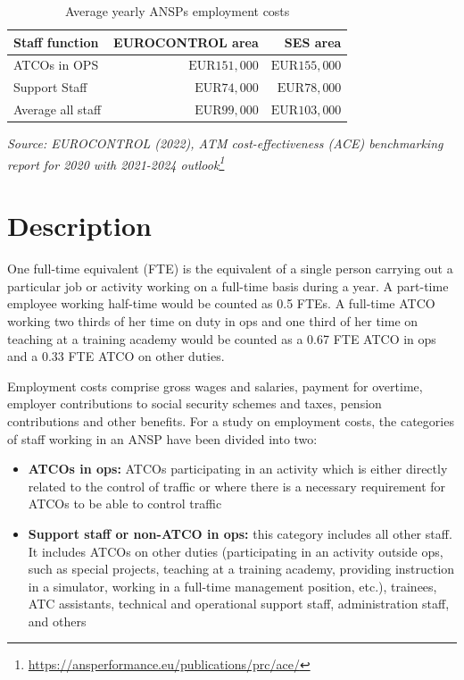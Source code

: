 \documentclass[
  11pt,
  a4paper,
]{book}
\DeclareRobustCommand{\href}[2]{#2\footnote{\url{#1}}}
\begin{document}
\hypertarget{tbl-ansp-employment-cost-general}{}
\setlength{\LTpost}{0mm}
\begin{longtable}{lrr}
\caption{\label{tbl-ansp-employment-cost-general}Average yearly ANSPs employment costs }\tabularnewline

\toprule
Staff function & EUROCONTROL area & SES area \\ 
\midrule
ATCOs in OPS & $\text{EUR}151,000$ & $\text{EUR}155,000$ \\ 
Support Staff & $\text{EUR}74,000$ & $\text{EUR}78,000$ \\ 
Average all staff & $\text{EUR}99,000$ & $\text{EUR}103,000$ \\ 
\bottomrule
\end{longtable}
\begin{minipage}{\linewidth}
\emph{Source: \href{https://ansperformance.eu/publications/prc/ace/}{EUROCONTROL (2022), ATM cost-effectiveness (ACE) benchmarking report for 2020 with 2021-2024 outlook}}\\
\end{minipage}

\hypertarget{description-4}{%
\section{Description}\label{description-4}}

One full-time equivalent (FTE) is the equivalent of a single person
carrying out a particular job or activity working on a full-time basis
during a year. A part-time employee working half-time would be counted
as 0.5 FTEs. A full-time ATCO working two thirds of her time on duty in
ops and one third of her time on teaching at a training academy would be
counted as a 0.67 FTE ATCO in ops and a 0.33 FTE ATCO on other duties.

Employment costs comprise gross wages and salaries, payment for
overtime, employer contributions to social security schemes and taxes,
pension contributions and other benefits. For a study on employment
costs, the categories of staff working in an ANSP have been divided into
two:

\begin{itemize}
\item
  \textbf{ATCOs in ops:} ATCOs participating in an activity which is
  either directly related to the control of traffic or where there is a
  necessary requirement for ATCOs to be able to control traffic
\item
  \textbf{Support staff or non-ATCO in ops:} this category includes all
  other staff. It includes ATCOs on other duties (participating in an
  activity outside ops, such as special projects, teaching at a training
  academy, providing instruction in a simulator, working in a full-time
  management position, etc.), trainees, ATC assistants, technical and
  operational support staff, administration staff, and others
\end{itemize}
\end{document}
